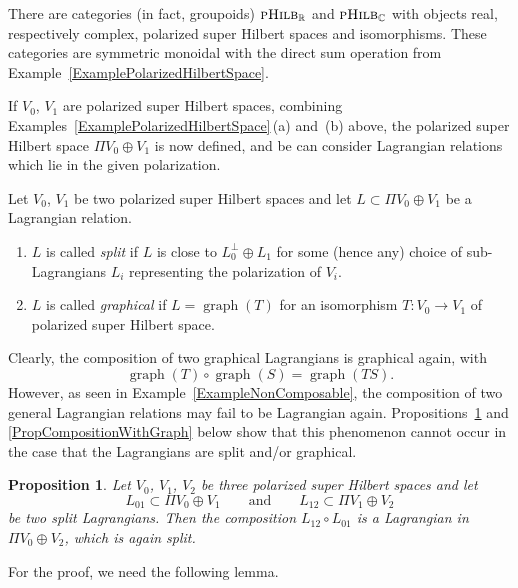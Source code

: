 \documentclass[10pt,a4paper]{amsart}
\numberwithin{equation}{section}
\newtheorem{Proposition}[Theorem]{Proposition}
 { \theoremstyle{definition}
\newtheorem{Definition}[Theorem]{Definition}
\newtheorem{Note}[Theorem]{Note}
\newtheorem{Example}[Theorem]{Example}
\newtheorem{Construction}[Theorem]{Construction}
\newtheorem{Observation}[Theorem]{Observation}
\newtheorem{Remark}[Theorem]{Remark} }
\DeclareMathOperator{\graph}{\mathrm{graph}}
\newcommand{\pHilb}{\textsc{pHilb}}
\newcommand{\R}{\mathbb{R}}
\newcommand{\C}{\mathbb{C}}
\begin{document}
There are categories (in fact, groupoids) $\pHilb_{\R}$ and $\pHilb_{\C}$ with objects real, respectively complex, polarized super Hilbert spaces and isomorphisms.
These categories are symmetric monoidal with the direct sum operation from Example~\ref{ExamplePolarizedHilbertSpace}.

If $V_0$, $V_1$ are polarized super Hilbert spaces, combining Examples~\ref{ExamplePolarizedHilbertSpace}\,(a) and~(b) above, the polarized super Hilbert space $\Pi V_0 \oplus V_1$ is now defined, and be can consider Lagrangian relations which lie in the given polarization.

\begin{Definition}
Let $V_0$, $V_1$ be two polarized super Hilbert spaces and let $L \subset \Pi V_0 \oplus V_1$ be a Lagrangian relation.
\begin{enumerate}\itemsep=0pt
\item[(a)]
$L$ is called \emph{split} if $L$ is close to $L_0^\perp \oplus L_1$ for some (hence any) choice of sub-Lagrangians $L_i$ representing the polarization of $V_i$.
\item[(b)]
$L$ is called \emph{graphical} if $L = \graph(T)$ for an isomorphism $T\colon V_0 \to V_1$ of polarized super Hilbert space.
\end{enumerate}
\end{Definition}

Clearly, the composition of two graphical Lagrangians is graphical again, with
\[
\graph(T) \circ \graph(S) = \graph(TS).
\]
However, as seen in Example~\ref{ExampleNonComposable}, the composition of two general Lagrangian relations may fail to be Lagrangian again.
Propositions~\ref{PropCompositionOfSplit} and \ref{PropCompositionWithGraph} below show that this phenomenon cannot occur in the case that the Lagrangians are split and/or graphical.

\begin{Proposition}\label{PropCompositionOfSplit}
 Let $V_0$, $V_1$, $V_2$ be three polarized super Hilbert spaces and let
 \begin{equation*}
 L_{01} \subset \Pi V_0 \oplus V_1 \qquad \text{and} \qquad L_{12} \subset \Pi V_1 \oplus V_2
 \end{equation*}
 be two split Lagrangians.
 Then the composition $L_{12} \circ L_{01}$ is a Lagrangian in $\Pi V_0 \oplus V_2$, which is again split.
\end{Proposition}

For the proof, we need the following lemma.
\end{document}

